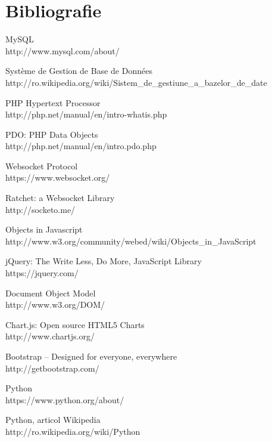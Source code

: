 \documentclass[12pt,a4paper]{article}
\begin{document}
\section{Bibliografie}
\begingroup
\renewcommand{\section}[2]{}%
\begin{thebibliography}{99}

	MySQL \\
	http://www.mysql.com/about/
	
	Système de Gestion de Base de Données\\
	http://ro.wikipedia.org/wiki/Sistem\_de\_gestiune\_a\_bazelor\_de\_date

	PHP Hypertext Processor\\
	http://php.net/manual/en/intro-whatis.php

	PDO: PHP Data Objects\\
	http://php.net/manual/en/intro.pdo.php
	
	Websocket Protocol\\
	https://www.websocket.org/
	
	Ratchet: a Websocket Library\\
	http://socketo.me/
	
	Objects in Javascript\\
	http://www.w3.org/community/webed/wiki/Objects\_in\_JavaScript
	
	jQuery: The Write Less, Do More, JavaScript Library\\
	https://jquery.com/
	
	Document Object Model\\
	http://www.w3.org/DOM/

	Chart.js: Open source HTML5 Charts \\
	http://www.chartjs.org/
	
	Bootstrap -- Designed for everyone, everywhere \\
	http://getbootstrap.com/
	
	Python \\
	https://www.python.org/about/

	Python, articol Wikipedia\\
	http://ro.wikipedia.org/wiki/Python
	

\end{thebibliography}
\end{document}

